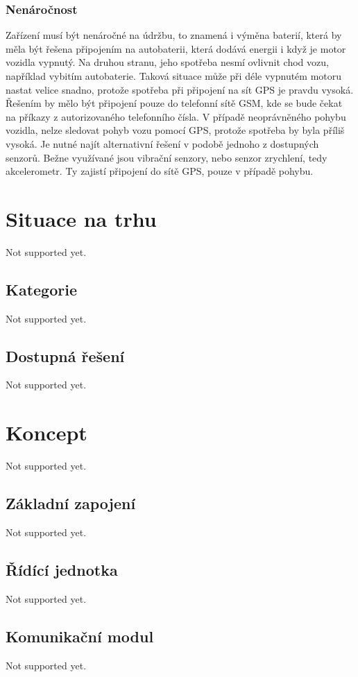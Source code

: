 \documentclass[FM,BP]{tulthesis}
\begin{document}
\subsection{Nenáročnost}
Zařízení musí být nenáročné na údržbu, to znamená i výměna baterií, která by měla být řešena připojením na autobaterii, která dodává energii i když je motor vozidla vypnutý. Na druhou stranu, jeho spotřeba nesmí ovlivnit chod vozu, například vybitím autobaterie. Taková situace může při déle vypnutém motoru nastat velice snadno, protože spotřeba při připojení na sít GPS je pravdu vysoká. Řešením by mělo být připojení pouze do telefonní sítě GSM, kde se bude čekat na příkazy z autorizovaného telefonního čísla. V případě neoprávněného pohybu vozidla, nelze sledovat pohyb vozu pomocí GPS, protože spotřeba by byla příliš vysoká. Je nutné najít alternativní řešení v podobě jednoho z dostupných senzorů. Bežne využívané jsou vibrační senzory, nebo senzor zrychlení, tedy akcelerometr. Ty zajistí připojení do sítě GPS, pouze v případě pohybu.

\chapter{Situace na trhu}
Not supported yet.

\section{Kategorie}
Not supported yet.

\section{Dostupná řešení}
Not supported yet.

\chapter{Koncept}
Not supported yet.

\section{Základní zapojení}
Not supported yet.

\section{Řídící jednotka}
Not supported yet.

\section{Komunikační modul}
Not supported yet.
\end{document}
